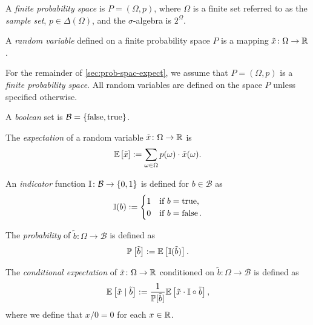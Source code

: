\begin{definition} \label{def:probability-space}
A \emph{finite probability space} is $P = (\Omega, p)$, where $\Omega$ is a finite set referred to as the \emph{sample set}, $p\in \Delta(\Omega)$, and the $\sigma$-algebra is $2^{\Omega}$.
 \leanok
\end{definition}

\begin{definition}
A \emph{random variable} defined on a finite probability space $P$ is a mapping $\tilde{x}\colon \Omega \to \mathbb{R}$.
 \leanok
\end{definition}

For the remainder of \cref{sec:prob-spac-expect}, we assume that $P = (\Omega, p)$ is a \emph{finite probability space}. All random variables are defined on the space $P$ unless specified otherwise.

\begin{definition}
A \emph{boolean} set is $\mathcal{B} = \left\{ \operatorname{false}, \operatorname{true} \right\}$.
 \leanok
\end{definition}

\begin{definition} \label{def:expect}
The \emph{expectation} of a random variable $\tilde{x} \colon \Omega \to \mathbb{R}$ is 
\[
\mathbb{E} \left[ \tilde{x} \right] := \sum_{\omega \in \Omega } p(\omega ) \cdot \tilde{x}(\omega).
\]
 \leanok
\end{definition}

\begin{definition} \label{def:indicator}
An \emph{indicator} function $\mathbb{I} \colon \mathcal{B} \to \left\{ 0, 1 \right\}$ is defined for $b\in \mathcal{B}$ as
\[
\mathbb{I}(b) :=
\begin{cases}
1 &\text{if } b = \operatorname{true}, \\
0 &\text{if } b = \operatorname{false}.
\end{cases}
\]
 \leanok
\end{definition}

\begin{definition} \label{def:probability}
The \emph{probability} of $\tilde{b}\colon \Omega \to \mathcal{B}$ is defined as
\[
\mathbb{P}\left[ \tilde{b} \right] := \mathbb{E}\left[\mathbb{I}(\tilde{b})\right].
\]
\end{definition}

\begin{definition} \label{def:expect-cnd}
The \emph{conditional expectation} of $\tilde{x} \colon \Omega \to \mathbb{R}$ conditioned on $\tilde{b} \colon \Omega \to \mathcal{B}$ is defined as
\[
\mathbb{E} \left[ \tilde{x} \mid  \tilde{b} \right] :=
\frac{1}{\mathbb{P}[\tilde{b}]} \mathbb{E} \left[  \tilde{x} \cdot \mathbb{I} \circ \tilde{b} \right],
\]
where we define that $x / 0 = 0$ for each $x\in \mathbb{R}$.
 \leanok
\end{definition}

